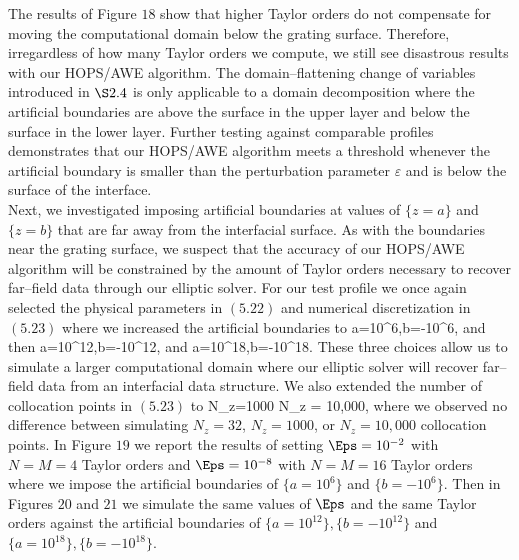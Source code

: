 \vspace{-18mm} The results of Figure $18$ show that higher Taylor orders do not compensate for moving the computational domain below the grating surface. Therefore, irregardless of how many Taylor orders we compute, we still see disastrous results with our HOPS/AWE algorithm. The domain--flattening change of variables introduced in $\S 2.4$ is only applicable to a domain decomposition where the artificial boundaries are above the surface in the upper layer and below the surface in the lower layer. Further testing against comparable profiles demonstrates that our HOPS/AWE algorithm meets a threshold whenever the artificial boundary is smaller than the perturbation parameter $\varepsilon$ and is below the surface of the interface.
\newline
\\
Next, we investigated imposing artificial boundaries at values of $\{z=a\}$ and $\{z=b\}$ that are far away from the interfacial surface. As with the boundaries near the grating surface, we suspect that the accuracy of our HOPS/AWE algorithm will be constrained by the amount of Taylor orders necessary to recover far--field data through our elliptic solver. For our test profile we once again selected the physical parameters in $(5.22)$ and numerical discretization in $(5.23)$ where we increased the artificial boundaries to
\bes
a=10^{6},\quad b=-10^{6},
\ees
and then 
\bes
a=10^{12},\quad b=-10^{12},
\ees
and
\bes
a=10^{18},\quad b=-10^{18}.
\ees
These three choices allow us to simulate a larger computational domain where our elliptic solver will recover far--field data from an interfacial data structure. We also extended the number of collocation points in $(5.23)$ to
\bes
N_z=1000 \quad {} \quad N_z = 10,000,
\ees
where we observed no difference between simulating $N_z=32$, $N_z=1000$, or $N_z=10,000$ collocation points. In Figure $19$ we report the results of setting $\Eps = 10^{-2}$ with $N=M=4$ Taylor orders and $\Eps = 10^{-8}$ with $N=M=16$ Taylor orders where we impose the artificial boundaries of $\{a=10^{6}\}$ and $\{b=-10^{6}\}$. Then in Figures $20$ and $21$ we simulate the same values of $\Eps$ and the same Taylor orders against the artificial boundaries of $\{a=10^{12}\}, \{b=-10^{12}\}$ and $\{a=10^{18}\}, \{b=-10^{18}\}$.
\vspace{-14mm}
